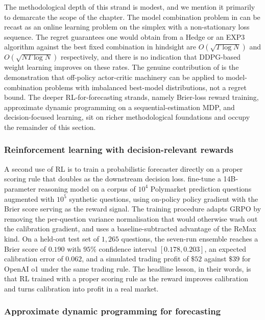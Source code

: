 The methodological depth of this strand is modest, and we mention it primarily to
demarcate the scope of the chapter. The model combination problem in
\citet{Fu2022} can be recast as an online learning problem on the simplex with a
non-stationary loss sequence. The regret guarantees one would obtain from a Hedge
or an EXP3 algorithm against the best fixed combination in hindsight are
$O(\sqrt{T \log N})$ and $O(\sqrt{N T \log N})$ respectively, and there is no
indication that DDPG-based weight learning improves on these rates. The genuine
contribution of \citet{Fu2022} is the demonstration that off-policy actor-critic
machinery can be applied to model-combination problems with imbalanced
best-model distributions, not a regret bound. The deeper RL-for-forecasting
strands, namely Brier-loss reward training, approximate dynamic programming on a
sequential-estimation MDP, and decision-focused learning, sit on richer
methodological foundations and occupy the remainder of this section.

\subsubsection{Reinforcement learning with decision-relevant rewards}
\label{sec:rl_brier}

A second use of RL is to train a probabilistic forecaster directly on a proper
scoring rule that doubles as the downstream decision loss. \citet{Turtel2025} fine-tune
a 14B-parameter reasoning model on a corpus of $10^4$ Polymarket prediction questions
augmented with $10^5$ synthetic questions, using on-policy policy gradient with the
Brier score serving as the reward signal. The training procedure adapts GRPO by
removing the per-question variance normalisation that would otherwise wash out the
calibration gradient, and uses a baseline-subtracted advantage of the ReMax kind. On
a held-out test set of $1{,}265$ questions, the seven-run ensemble reaches a Brier
score of $0.190$ with $95\%$ confidence interval $[0.178, 0.203]$, an expected
calibration error of $0.062$, and a simulated trading profit of $\$52$ against $\$39$
for OpenAI o1 under the same trading rule. The headline lesson, in their words, is
that RL trained with a proper scoring rule as the reward improves calibration and
turns calibration into profit in a real market.

\subsubsection{Approximate dynamic programming for forecasting}
\label{sec:adp_forecasting}

